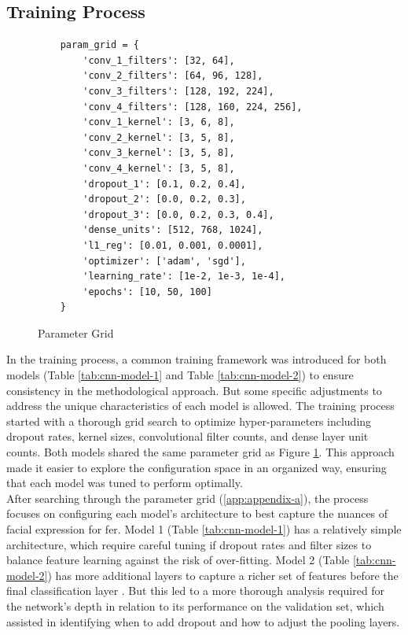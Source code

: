 \subsection{Training Process}
\begin{figure}[h!] 
    \centering
\begin{verbatim}
    param_grid = {
        'conv_1_filters': [32, 64],
        'conv_2_filters': [64, 96, 128],
        'conv_3_filters': [128, 192, 224],
        'conv_4_filters': [128, 160, 224, 256],
        'conv_1_kernel': [3, 6, 8],
        'conv_2_kernel': [3, 5, 8],
        'conv_3_kernel': [3, 5, 8],
        'conv_4_kernel': [3, 5, 8],
        'dropout_1': [0.1, 0.2, 0.4],
        'dropout_2': [0.0, 0.2, 0.3],
        'dropout_3': [0.0, 0.2, 0.3, 0.4],
        'dense_units': [512, 768, 1024],
        'l1_reg': [0.01, 0.001, 0.0001],
        'optimizer': ['adam', 'sgd'],
        'learning_rate': [1e-2, 1e-3, 1e-4], 
        'epochs': [10, 50, 100]
    }
\end{verbatim}
    \caption{Parameter Grid}
    \label{fig:param_grid}
\end{figure}
In the training process, a common training framework was introduced for both models (Table \ref{tab:cnn-model-1} and Table \ref{tab:cnn-model-2}) to ensure consistency in the methodological approach.
But some specific adjustments to address the unique characteristics of each model is allowed.
The training process started with a thorough grid search to optimize hyper-parameters including dropout rates, kernel sizes, convolutional filter counts, and dense layer unit counts.
Both models shared the same parameter grid as Figure \ref{fig:param_grid}.
This approach made it easier to explore the configuration space in an organized way, ensuring that each model was tuned to perform optimally.
\\
\indent After searching through the parameter grid (\ref{app:appendix-a}), the process focuses on configuring each model's architecture to best capture the nuances of facial expression for \gls{fer}.
Model 1 (Table \ref{tab:cnn-model-1}) has a relatively simple architecture, which require careful tuning if dropout rates and filter sizes to balance feature learning against the risk of over-fitting.
Model 2 (Table \ref{tab:cnn-model-2}) has more additional layers to capture a richer set of features before the final classification layer . 
But this led to a more thorough analysis required for the network's depth in relation to its performance on the validation set, which assisted in identifying when to add dropout and how to adjust the pooling layers.  
